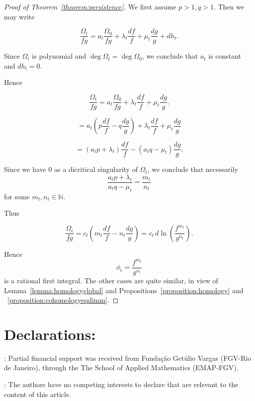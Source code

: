 \documentclass[11pt,a4paper]{amsart}
\theoremstyle{definition}
\begin{document}
\begin{proof}[Proof of Theorem~\ref{theorem:persistence}]

We first assume \(p>1, q>1\).
Then we may write

\[
\frac{\Omega_t}{fg}
=
a_t \frac{\Omega_0}{fg}
+ \lambda_t \frac{df}{f}
+ \mu_t \frac{dg}{g}
+ dh_t.
\]

Since \(\Omega_t\) is polynomial and \(\deg \Omega_t = \deg \Omega_0\),
we conclude that \(a_t\) is constant and \(dh_t=0\).

Hence

\[
\frac{\Omega_t}{fg}
=
a_t \frac{\Omega_0}{fg}
+ \lambda_t \frac{df}{f}
+ \mu_t \frac{dg}{g}.
\]

\[
=
a_t \left(p \frac{df}{f} - q \frac{dg}{g}\right)
+ \lambda_t \frac{df}{f}
+ \mu_t \frac{dg}{g}
\]

\[
=
(a_t p + \lambda_t)\frac{df}{f}
-
(a_t q - \mu_t)\frac{dg}{g}.
\]

Since we have \(0\) as a dicritical singularity of \(\Omega_t\),
we conclude that necessarily
\[
\frac{a_t p + \lambda_t}{a_t q - \mu_t}
=
\frac{m_t}{n_t}
\]
for some \(m_t, n_t \in \mathbb N\).

Thus

\[
\frac{\Omega_t}{fg}
=
c_t \left(
m_t \frac{df}{f}
-
n_t \frac{dg}{g}
\right)
=
c_t \, d \ln \left(\frac{f^{m_t}}{g^{n_t}}\right).
\]

Hence
\[
\phi_t = \frac{f^{m_t}}{g^{n_t}}
\]
is a rational first integral.
The other cases are quite similar, in view of Lemma~\ref{lemma:homologyglobal} and Propositions~\ref{proposition:homology} and ~\ref{proposition:cohomologyeqdimm}. 
\end{proof}



\section{Declarations:}

: Partial financial support was received from Fundação Getúlio Vargas (FGV-Rio de Janeiro), through the  The School of Applied Mathematics (EMAP-FGV).


: The authors have no competing interests to declare that are relevant to the content of this article.






\end{document}
